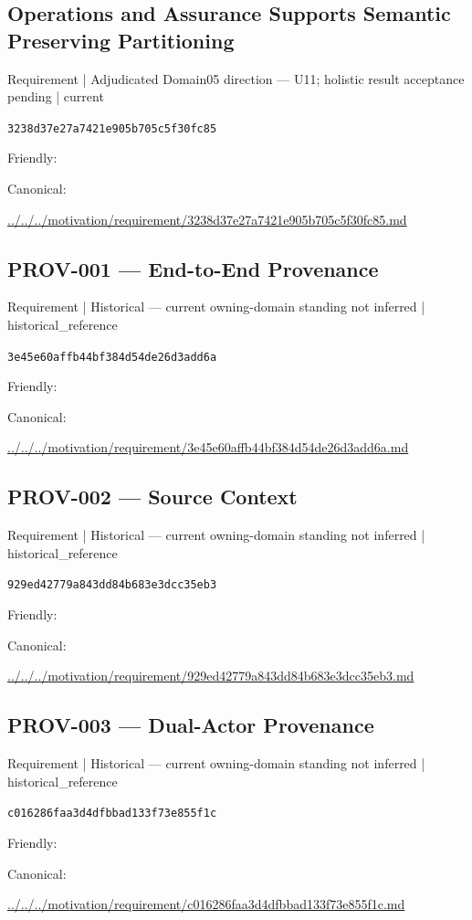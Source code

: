 \documentclass[10pt,a4paper]{article}
\begin{document}
\subsection*{Operations and Assurance Supports Semantic Preserving Partitioning}
{\small Requirement | Adjudicated Domain05 direction — U11; holistic result acceptance pending | current}\par
\texttt{3238d37e27a7421e905b705c5f30fc85}\par
Friendly: \par
Canonical: \par
{\footnotesize\url{../../../motivation/requirement/3238d37e27a7421e905b705c5f30fc85.md}}\par
\subsection*{PROV-001 — End-to-End Provenance}
{\small Requirement | Historical — current owning-domain standing not inferred | historical\_reference}\par
\texttt{3e45e60affb44bf384d54de26d3add6a}\par
Friendly: \par
Canonical: \par
{\footnotesize\url{../../../motivation/requirement/3e45e60affb44bf384d54de26d3add6a.md}}\par
\subsection*{PROV-002 — Source Context}
{\small Requirement | Historical — current owning-domain standing not inferred | historical\_reference}\par
\texttt{929ed42779a843dd84b683e3dcc35eb3}\par
Friendly: \par
Canonical: \par
{\footnotesize\url{../../../motivation/requirement/929ed42779a843dd84b683e3dcc35eb3.md}}\par
\subsection*{PROV-003 — Dual-Actor Provenance}
{\small Requirement | Historical — current owning-domain standing not inferred | historical\_reference}\par
\texttt{c016286faa3d4dfbbad133f73e855f1c}\par
Friendly: \par
Canonical: \par
{\footnotesize\url{../../../motivation/requirement/c016286faa3d4dfbbad133f73e855f1c.md}}\par
\end{document}

